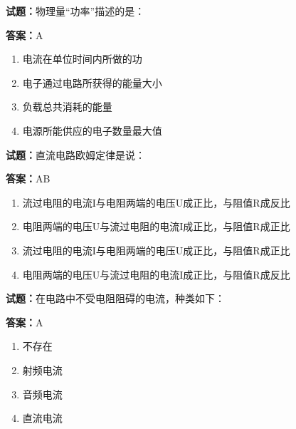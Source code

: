 \documentclass{ctexbook}
\begin{document}




\vspace{1em}

\textbf{试题：}物理量“功率”描述的是： 

\textbf{答案：}A 

\begin{enumerate}[leftmargin=3em]
  \item 电流在单位时间内所做的功 

  \item 电子通过电路所获得的能量大小 

  \item 负载总共消耗的能量 

  \item 电源所能供应的电子数量最大值 

\end{enumerate}





\vspace{1em}

\textbf{试题：}直流电路欧姆定律是说： 

\textbf{答案：}AB 

\begin{enumerate}[leftmargin=3em]
  \item 流过电阻的电流I与电阻两端的电压U成正比，与阻值R成反比 

  \item 电阻两端的电压U与流过电阻的电流I成正比，与阻值R成正比 

  \item 流过电阻的电流I与电阻两端的电压U成正比，与阻值R成正比 

  \item 电阻两端的电压U与流过电阻的电流I成正比，与阻值R成反比 

\end{enumerate}





\vspace{1em}

\textbf{试题：}在电路中不受电阻阻碍的电流，种类如下： 

\textbf{答案：}A 

\begin{enumerate}[leftmargin=3em]
  \item 不存在 

  \item 射频电流 

  \item 音频电流 

  \item 直流电流 

\end{enumerate}
\end{document}
